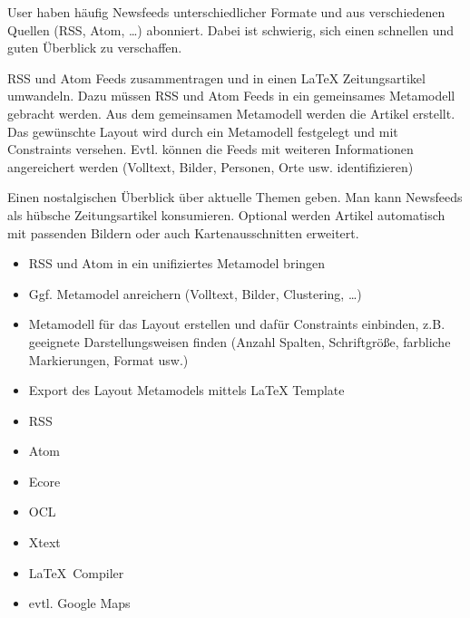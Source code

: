 \documentclass{article}
\date{\today}
\begin{document}
\maketitle

\begin{multicols}{3}{
		User haben häufig Newsfeeds unterschiedlicher Formate und aus verschiedenen Quellen (RSS, Atom, …) abonniert. Dabei ist schwierig, sich einen schnellen und guten Überblick zu verschaffen. 
		\closearticle
		
		RSS und Atom Feeds zusammentragen und in einen  LaTeX Zeitungsartikel umwandeln. Dazu müssen RSS und Atom Feeds in ein gemeinsames Metamodell gebracht werden. Aus dem gemeinsamen Metamodell werden die Artikel erstellt. Das gewünschte Layout wird durch ein Metamodell festgelegt und mit Constraints versehen. Evtl. können die Feeds mit weiteren Informationen angereichert werden (Volltext, Bilder, Personen, Orte usw. identifizieren)
		\closearticle
		
		Einen nostalgischen Überblick über aktuelle Themen geben. Man kann Newsfeeds als hübsche Zeitungsartikel konsumieren. Optional werden Artikel automatisch mit passenden Bildern oder auch Kartenausschnitten erweitert. 
		\closearticle
		
		\begin{itemize}
			\item RSS und Atom in ein unifiziertes Metamodel bringen
			\item Ggf. Metamodel anreichern (Volltext, Bilder, Clustering, …)
			\item Metamodell für das Layout erstellen und dafür Constraints  einbinden, z.B. geeignete Darstellungsweisen finden (Anzahl Spalten, Schriftgröße, farbliche Markierungen, Format usw.)
			\item Export des Layout Metamodels mittels LaTeX Template
		\end{itemize}
		
		\begin{itemize}
			\item RSS
			\item Atom
			\item Ecore
			\item OCL
			\item Xtext
			\item \LaTeX\ Compiler
			\item evtl. Google Maps
		\end{itemize}
		\closearticle
		}


\end{multicols}
\end{document}
